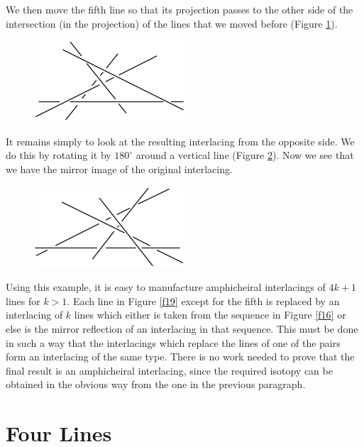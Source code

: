 \documentclass{article}
\begin{document}
We then move the fifth line so that its projection passes 
to the other
side of the intersection (in the projection) of the lines that we moved before
(Figure \ref{f21}). 
\begin{figure}
{\includegraphics{imagesSkewlines/x21.png}}
\caption{}
\label{f21}
\end{figure}

It remains simply to look at the resulting 
interlacing from the
opposite side. We do this by rotating it by $180^\circ$ around a vertical line
(Figure \ref{f22}). Now we see that we have the mirror image of the 
original interlacing.
\begin{figure}
{\includegraphics{imagesSkewlines/x22.png}}
\caption{}
\label{f22}
\end{figure}


Using this example, it is easy to manufacture amphicheiral interlacings of $4k+1$
lines for $k>1$. Each line in Figure \ref{f19} except for the fifth 
is replaced by
an interlacing of $k$ lines which either is taken from the sequence in Figure
\ref{f16} or else is the mirror reflection of an interlacing in that 
sequence. This
must be done in such a way that the interlacings which replace the lines of one
of the pairs form an interlacing of the same type. There is no work needed to prove that the final result is an 
amphicheiral
interlacing, since the required isotopy can be obtained in the obvious way from
the one in the previous paragraph.


\section{Four Lines}
\end{document}
